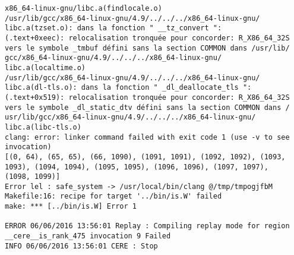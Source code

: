 \documentclass{article}
\begin{document}
\begin{lstlisting}
x86_64-linux-gnu/libc.a(findlocale.o)
/usr/lib/gcc/x86_64-linux-gnu/4.9/../../../x86_64-linux-gnu/
libc.a(tzset.o): dans la fonction " __tz_convert ":
(.text+0xeec): relocalisation tronquée pour concorder: R_X86_64_32S 
vers le symbole _tmbuf défini sans la section COMMON dans /usr/lib/
gcc/x86_64-linux-gnu/4.9/../../../x86_64-linux-gnu/
libc.a(localtime.o)
/usr/lib/gcc/x86_64-linux-gnu/4.9/../../../x86_64-linux-gnu/
libc.a(dl-tls.o): dans la fonction " _dl_deallocate_tls ":
(.text+0x519): relocalisation tronquée pour concorder: R_X86_64_32S 
vers le symbole _dl_static_dtv défini sans la section COMMON dans /
usr/lib/gcc/x86_64-linux-gnu/4.9/../../../x86_64-linux-gnu/
libc.a(libc-tls.o)
clang: error: linker command failed with exit code 1 (use -v to see 
invocation)
[(0, 64), (65, 65), (66, 1090), (1091, 1091), (1092, 1092), (1093, 
1093), (1094, 1094), (1095, 1095), (1096, 1096), (1097, 1097), 
(1098, 1099)]
Error lel : safe_system -> /usr/local/bin/clang @/tmp/tmpogjfbM
Makefile:16: recipe for target '../bin/is.W' failed
make: *** [../bin/is.W] Error 1

ERROR 06/06/2016 13:56:01 Replay : Compiling replay mode for region 
__cere__is_rank_475 invocation 9 Failed
INFO 06/06/2016 13:56:01 CERE : Stop
\end{lstlisting}
\end{document}
